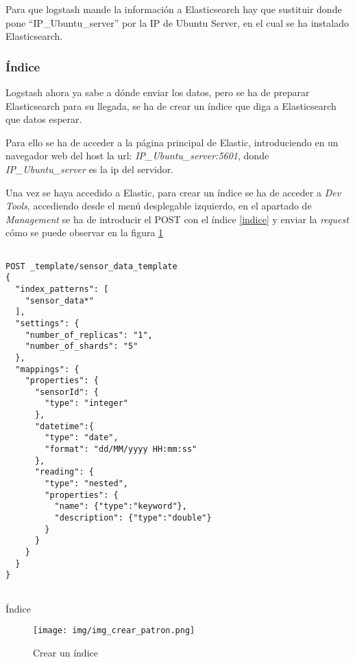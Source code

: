 Para que logstash mande la información a Elasticsearch hay que sustituir donde pone ``IP\_Ubuntu\_server'' por la IP de Ubuntu Server, en el cual se ha instalado Elasticsearch.

\subsubsection{Índice}

Logstash ahora ya sabe a dónde enviar los datos, pero se ha de preparar Elasticsearch para su llegada, se ha de crear un índice que diga a Elasticsearch que datos esperar.

Para ello se ha de acceder a la página principal de Elastic, introduciendo en un navegador web del host la url: \textit{IP\_Ubuntu\_server:5601}, donde \textit{IP\_Ubuntu\_server} es la ip del servidor.

Una vez se haya accedido a Elastic, para crear un índice se ha de acceder a \textit{Dev Tools}, accediendo desde el menú desplegable izquierdo, en el apartado de \textit{Management} se ha de introducir el POST con el índice \ref{indice} y enviar la \textit{request} cómo se puede observar en la figura \ref{img_index}



\begin{listing}
\begin{verbatim}

POST _template/sensor_data_template
{
  "index_patterns": [
    "sensor_data*"
  ],
  "settings": {
    "number_of_replicas": "1",
    "number_of_shards": "5"
  },
  "mappings": {
    "properties": {
      "sensorId": {
        "type": "integer"
      },
      "datetime":{
        "type": "date",
        "format": "dd/MM/yyyy HH:mm:ss"
      },
      "reading": {
        "type": "nested", 
        "properties": { 
          "name": {"type":"keyword"},
          "description": {"type":"double"}
        }
      }
    }
  }
}


\end{verbatim}
\caption{Índice} 
\label{indice}
\end{listing}

\begin{figure}[h]
	\centering
	\texttt{[image: img/img\_crear\_patron.png]}
	\caption{Crear un índice}
	\label{img_index}
\end{figure}
\newpage

